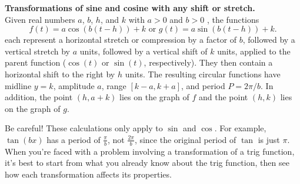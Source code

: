 \documentclass{ximera}
\begin{document}
\begin{callout}
\textbf{Transformations of sine and cosine with any shift or stretch.}\\
Given real numbers \(a\), \(b\), \(h\), and \(k\) with \(a > 0\) and \(b > 0\) , the functions%
\begin{equation*}
f(t) = a\cos(b(t-h))+k \text{ or } g(t) = a\sin(b(t-h)) + k\text{.}
\end{equation*}
each represent a horizontal stretch or compression by a factor of $b$, followed by a vertical stretch by \(a\) units, followed by a vertical shift of \(k\) units, applied to the parent function (\(\cos(t)\) or \(\sin(t)\), respectively). They then contain a horizontal shift to the right by $h$ units. The resulting circular functions have midline \(y = k\), amplitude \(a\), range \([k-a,k+a]\), and period \(P = 2\pi/b\). In addition, the point \((h,a+k)\) lies on the graph of \(f\) and the point \((h, k)\) lies on the graph of \(g\).
\end{callout}

\begin{callout}
Be careful! These calculations only apply to $\sin$ and $\cos$. For example, $\tan(bx)$ has a period of $\frac{\pi}{b}$, not $\frac{2\pi}{b}$, since the original period of $\tan$ is just $\pi$. When you're faced with a problem involving a transformation of a trig function, it's best to start from what you already know about the trig function, then see how each transformation affects its properties. 
\end{callout}
\end{document}
